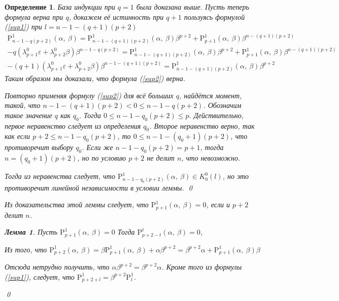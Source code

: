 \documentclass[12pt, reqno, a4paper, oneside, notitlepage]{amsart}
\makeatletter
\theoremstyle{mytheoremstyle}
\newtheorem{lemma}[theorem]{Лемма}
\theoremstyle{myremarkstyle}
\newtheorem{definition}[theorem]{Определение}
\numberwithin{equation}{section}
\renewenvironment{proof}[1][\proofname]{\par\indent {\bfseries #1\@addpunct{.} }}{\qed}
\makeatother
\begin{document}
\begin{definition}
\begin{proof}
  База индукции при $q = 1$ была доказана выше.
  Пусть теперь формула верна при $q$, докажем её истинность при $q+1$ пользуясь формулой (\ref{sup1}) при $l = n-1-(q+1)(p+2)$
  \begin{eqnarray*}
  \mathrm{P}^1_{n-1-q(p+2)}(\alpha,\ \beta) = \mathrm{P}^1_{n-1-(q+1)(p+2)}(\alpha,\ \beta)\beta^{p+2} + \mathrm{P}^1_{p+1}(\alpha,\ \beta)\beta^{n-(q+1)(p+2)}\\
	-q(\lambda^0_{p+1}\varepsilon+ \lambda^0_{p+2}\beta)\beta^{n-1-q(p+2)} = \mathrm{P}^1_{n-1-(q+1)(p+2)}(\alpha,\ \beta)\beta^{p+2} + \mathrm{P}^1_{p+1}(\alpha,\ \beta)\beta^{n-(q+1)(p+2)}\\
	-(q+1)(\lambda^0_{p+1}\varepsilon+ \lambda^0_{p+2}\beta)\beta^{n-1-(q+1)(p+2)} = \mathrm{P}^1_{n-1-(q+1)(p+2)}(\alpha,\ \beta)\beta^{p+2}
  \end{eqnarray*}
  Таким образом мы доказали, что формула (\ref{sup2}) верна.

  Повторно применяя формулу (\ref{sup2}) для всё больших $q$, найдётся момент, такой, что $n-1-(q+1)(p+2) < 0 \leq n-1-q(p+2)$. Обозначим такое значение $q$ как $q_0$.
  Тогда $0 \leq n-1-q_0(p+2) \leq p$. Действительно, первое неравенство следует из определения $q_0$.
  Второе неравенство верно, так как если $p+2 \leq n-1-q_0(p+2)$, то $0 \leq n-1-(q_0+1)(p+2)$, что противоречит выбору $q_0$. 
  Если же $n-1-q_0(p+2) = p+1$, тогда $n = (q_0+1)(p+2)$, но по условию $p+2$ не делит $n$, что невозможно.

  Тогда из неравенства следует, что $\mathrm{P}^1_{n-1-q_0(p+2)}(\alpha,\ \beta) \in K^0_0(l)$, но это противоречит линейной независимости в условии леммы.
\end{proof}

Из доказательства этой леммы следует, что $\mathrm{P}^1_{p+1}(\alpha,\ \beta) = 0$, 
если и $p+2$ делит $n$.

\begin{lemma}\label{support up}
  Пусть $\mathrm{P}^1_{p+1}(\alpha,\ \beta) = 0$
  Тогда $\mathrm{P}^t_{p+2-t}(\alpha,\ \beta) = 0$, 
\end{lemma}

\begin{proof}
  Из того, что $\mathrm{P}^1_{p+2}(\alpha,\ \beta) = 
  \beta\mathrm{P}^1_{p+1}(\alpha,\ \beta) + \alpha\beta^{p+2} = 
  \beta^{p+2}\alpha + \mathrm{P}^1_{p+1}(\alpha,\ \beta)\beta$

  Отсюда нетрудно получить, что $\alpha\beta^{p+2}=\beta^{p+2}\alpha$.
  Кроме того из формулы (\ref{sup1}), следует, что
  $\mathrm{P}^1_{p+2+l} = \beta^{p+2}\mathrm{P}^1_l$.


\end{proof}
\end{definition}
\end{document}
